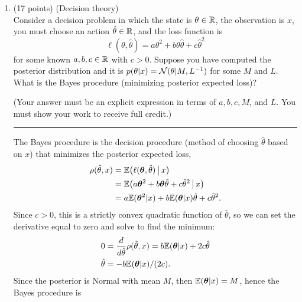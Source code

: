 \documentclass[12pt]{article}
\newcommand{\ds}{\displaystyle}
\newcommand*\circled[1]{\tikz[baseline=(char.base)]{\node[shape=rectangle,draw,inner sep=2mm,rounded corners=2mm] (char) {#1};}}
\begin{document}
\begin{enumerate}
\newpage
\item (17 points) (Decision theory)\\
    Consider a decision problem in which the state is $\theta\in\mathbb{R}$, the observation is $x$, you must choose an action
    $\hat\theta\in\mathbb{R}$, and the loss function is
    $$\ell(\theta,\hat\theta) = a\theta^2 + b\theta\hat\theta + c\hat\theta^2$$
    for some known $a,b,c\in\mathbb{R}$ with $c>0$.
    Suppose you have computed the posterior distribution and it is $p(\theta|x) = \mathcal{N}(\theta|M,L^{-1})$ for some $M$ and $L$.
    What is the Bayes procedure (minimizing posterior expected loss)?

    \vspace{1em}
    (Your answer must be an explicit expression in terms of $a,b,c,M$, and $L$. You must show your work to receive full credit.)

    \vspace{1em} \hrule
    The Bayes procedure is the decision procedure (method of choosing $\hat\theta$ based on $x$) that minimizes the posterior expected loss,
    \begin{align*}
        \rho(\hat\theta,x) &= \mathbb{E}\big(\ell({\bm\theta},\hat\theta)\,\big\vert\, x\big) \\
                           &= \mathbb{E}\big(a{\bm\theta}^2 + b{\bm\theta}\hat\theta + c\hat\theta^2\,\big\vert\, x\big) \\
                           &= a\mathbb{E}({\bm\theta}^2|x) + b\mathbb{E}({\bm\theta}|x)\hat\theta + c\hat\theta^2. \\
    \end{align*}
    Since $c>0$, this is a strictly convex quadratic function of $\hat\theta$, so we can set the
    derivative equal to zero and solve to find the minimum:
    \begin{align*}
        0 &= \frac{d}{d\hat\theta}\rho(\hat\theta,x) = b\mathbb{E}({\bm\theta}|x) + 2 c\hat\theta \\
        \hat\theta &= -b\mathbb{E}({\bm\theta}|x)/(2c).
    \end{align*}
    Since the posterior is Normal with mean $M$, then $\mathbb{E}({\bm\theta}|x) = M$, hence the Bayes procedure is

    \begin{center}
    \circled{$\ds\hat\theta = \frac{-b M}{2c}.$}
    \end{center}





\end{enumerate}
\end{document}
